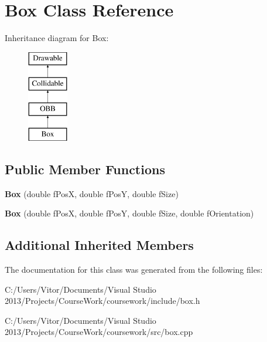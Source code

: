 \hypertarget{class_box}{}\section{Box Class Reference}
\label{class_box}
Inheritance diagram for Box\+:\begin{figure}[H]
\begin{center}
\leavevmode
\includegraphics[height=4.000000cm]{class_box}
\end{center}
\end{figure}
\subsection*{Public Member Functions}
\begin{DoxyCompactItemize}
\item 
\hypertarget{class_box_a92b74dcd0fe4b7936fff4d2f6ba5dea6}{}{\bfseries Box} (double f\+Pos\+X, double f\+Pos\+Y, double f\+Size)\label{class_box_a92b74dcd0fe4b7936fff4d2f6ba5dea6}

\item 
\hypertarget{class_box_a37d5ea9b6928de4528869fc1e04c8c85}{}{\bfseries Box} (double f\+Pos\+X, double f\+Pos\+Y, double f\+Size, double f\+Orientation)\label{class_box_a37d5ea9b6928de4528869fc1e04c8c85}

\end{DoxyCompactItemize}
\subsection*{Additional Inherited Members}


The documentation for this class was generated from the following files\+:\begin{DoxyCompactItemize}
\item 
C\+:/\+Users/\+Vitor/\+Documents/\+Visual Studio 2013/\+Projects/\+Course\+Work/coursework/include/box.\+h\item 
C\+:/\+Users/\+Vitor/\+Documents/\+Visual Studio 2013/\+Projects/\+Course\+Work/coursework/src/box.\+cpp\end{DoxyCompactItemize}
